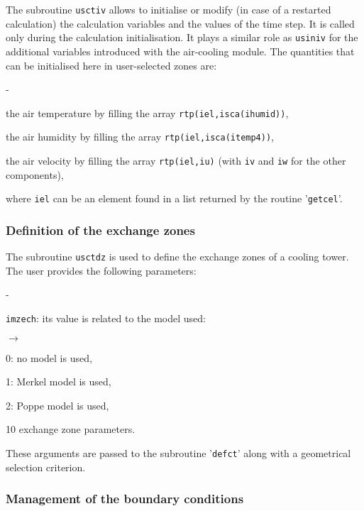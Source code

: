 {{{The subroutine \texttt{usctiv} allows to initialise or modify 
(in case of a restarted calculation) the calculation variables and the
 values of the time step. It is called only during the calculation 
initialisation. It plays a similar role as \texttt{usiniv} for the 
additional variables introduced with the air-cooling module. The 
quantities that can be initialised here in user-selected zones are:
\begin{list}{-}{}
 \item the air temperature by filling the array \texttt{rtp(iel,isca(ihumid))},
 \item the air humidity by filling the array \texttt{rtp(iel,isca(itemp4))},
 \item the air velocity by filling the array \texttt{rtp(iel,iu)} (with
 \texttt{iv} and \texttt{iw} for the other components),
\end{list}
where \texttt{iel} can be an element found in a list returned by the routine
 '\texttt{getcel}'.

\subsubsection{Definition of the exchange zones}

The subroutine \texttt{usctdz} is used to define the exchange zones of a cooling
 tower. The user provides the following parameters:
\begin{list}{-}{}
 \item \texttt{imzech}: its value is related to the model used:
      \begin{list}{$\rightarrow$}{}
       \item 0: no model is used,
       \item 1: Merkel model is used,
       \item 2: Poppe model is used,
      \end{list}
 \item 10 exchange zone parameters.
\end{list}
These arguments are passed to the subroutine '\texttt{defct}' along with a 
geometrical selection criterion.

\subsubsection{Management of the boundary conditions}

}}}
